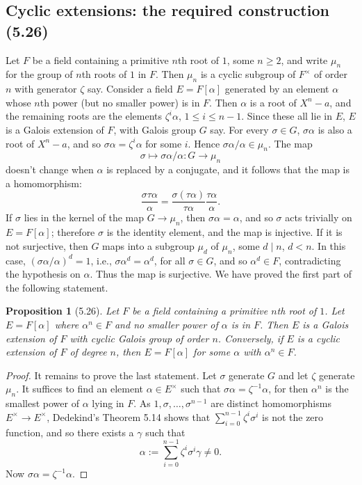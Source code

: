 \documentclass[UTF8,11pt,a4paper]{ctexart}
\newtheorem*{proposition}{Proposition}
\theoremstyle{definition}\newtheorem*{definition}{Definition}
\theoremstyle{remark}\newtheorem*{remark}{Remark}
\begin{document}
\subsection*{Cyclic extensions: the required construction (5.26)}
Let $F$ be a field containing a primitive $n$th root of $1$, some $n\ge2$, and write $\mu_n$ for the group of $n$th roots of $1$ in $F$. Then $\mu_n$ is a cyclic subgroup of $F^\times$ of order $n$ with generator $\zeta$ say.
Consider a field $E=F[\alpha]$ generated by an element $\alpha$ whose $n$th power (but no smaller power) is in $F$. Then $\alpha$ is a root of $X^n-a$, and the remaining roots are the elements $\zeta^i\alpha$, $1\le i\le n-1$. Since these all lie in $E$, $E$ is a Galois extension of $F$, with Galois group $G$ say. For every $\sigma\in G$, $\sigma\alpha$ is also a root of $X^n-a$, and so $\sigma\alpha=\zeta^i\alpha$ for some $i$. Hence $\sigma\alpha/\alpha\in\mu_n$. The map
\[
\sigma\longmapsto\sigma\alpha/\alpha:G\longrightarrow\mu_n
\]
doesn't change when $\alpha$ is replaced by a conjugate, and it follows that the map is a homomorphism:
\[
\frac{\sigma\tau\alpha}{\alpha}
=\frac{\sigma(\tau\alpha)}{\tau\alpha}\frac{\tau\alpha}{\alpha}.
\]
If $\sigma$ lies in the kernel of the map $G\to\mu_n$, then $\sigma\alpha=\alpha$, and so $\sigma$ acts trivially on $E=F[\alpha]$; therefore $\sigma$ is the identity element, and the map is injective. If it is not surjective, then $G$ maps into a subgroup $\mu_d$ of $\mu_n$, some $d\mid n$, $d<n$. In this case, $(\sigma\alpha/\alpha)^d=1$, i.e., $\sigma\alpha^d=\alpha^d$, for all $\sigma\in G$, and so $\alpha^d\in F$, contradicting the hypothesis on $\alpha$. Thus the map is surjective. We have proved the first part of the following statement.
\begin{proposition}[5.26]
Let $F$ be a field containing a primitive $n$th root of $1$. Let $E=F[\alpha]$ where $\alpha^n\in F$ and no smaller power of $\alpha$ is in $F$. Then $E$ is a Galois extension of $F$ with cyclic Galois group of order $n$. Conversely, if $E$ is a cyclic extension of $F$ of degree $n$, then $E=F[\alpha]$ for some $\alpha$ with $\alpha^n\in F$.
\end{proposition}
\begin{proof}
It remains to prove the last statement. Let $\sigma$ generate $G$ and let $\zeta$ generate $\mu_n$. It suffices to find an element $\alpha\in E^\times$ such that $\sigma\alpha=\zeta^{-1}\alpha$, for then $\alpha^n$ is the smallest power of $\alpha$ lying in $F$. As $1,\sigma,\ldots,\sigma^{n-1}$ are distinct homomorphisms $E^\times\to E^\times$, Dedekind's Theorem 5.14 shows that $\sum_{i=0}^{n-1}\zeta^i\sigma^i$ is not the zero function, and so there exists a $\gamma$ such that
\[
\alpha\mathrel{:=}\sum_{i=0}^{n-1}\zeta^i\sigma^i\gamma\ne0.
\]
Now $\sigma\alpha=\zeta^{-1}\alpha$.
\end{proof}
\end{document}
